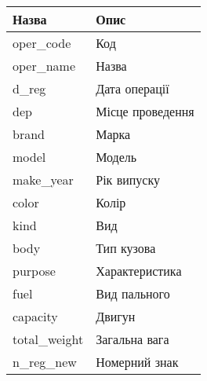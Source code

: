 \chapter{}

\begin{table}[h!]
  \small
  \centering
  \begin{tabular}{|l|l|}
    \hline
    \textbf{Назва} & \textbf{Опис}\\ \hline
    oper\_code & Код\\               \hline
    oper\_name & Назва\\             \hline
    d\_reg & Дата операції\\         \hline
    dep & Місце проведення\\         \hline
    brand & Марка\\                  \hline
    model & Модель\\                 \hline
    make\_year & Рік випуску\\       \hline
    color & Колір\\                  \hline
    kind & Вид\\                     \hline
    body & Тип кузова\\              \hline
    purpose & Характеристика\\       \hline
    fuel & Вид пального\\            \hline
    capacity & Двигун\\              \hline
    total\_weight & Загальна вага\\  \hline
    n\_reg\_new & Номерний знак\\
    \hline
  \end{tabular}
  \caption{}
  \label{fig:csv-documet-structure}
\end{table}
